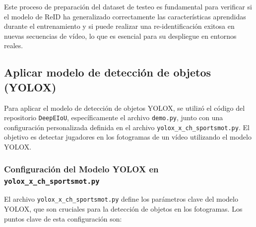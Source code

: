 \documentclass[12pt, a4paper, twoside]{article}
\begin{document}
	Este proceso de preparación del dataset de testeo es fundamental para verificar si el modelo de ReID ha generalizado correctamente las características aprendidas durante el entrenamiento y si puede realizar una re-identificación exitosa en nuevas secuencias de vídeo, lo que es esencial para su despliegue en entornos reales.
	
	
	\subsection{Aplicar modelo de detección de objetos (YOLOX)}
	
	Para aplicar el modelo de detección de objetos YOLOX, se utilizó el código del repositorio \texttt{DeepEIoU}, específicamente el archivo \texttt{demo.py}, junto con una configuración personalizada definida en el archivo \texttt{yolox\_x\_ch\_sportsmot.py}. El objetivo es detectar jugadores en los fotogramas de un vídeo utilizando el modelo YOLOX.
	
	\subsubsection{Configuración del Modelo YOLOX en \texttt{yolox\_x\_ch\_sportsmot.py}}
	
	El archivo \texttt{yolox\_x\_ch\_sportsmot.py} define los parámetros clave del modelo YOLOX, que son cruciales para la detección de objetos en los fotogramas. Los puntos clave de esta configuración son:
	
\end{document}
